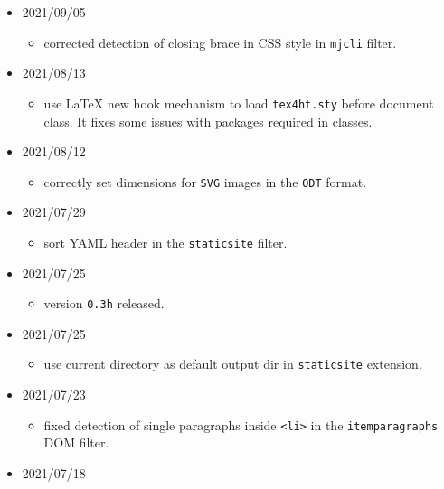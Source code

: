 \begin{itemize}
  \begin{itemize}
  \tightlist
  \item
    corrected SVG dimension setting in the ODT output. Dimensions are
    set also for PNG and JPG pictures.
  \end{itemize}
\item
  2021/09/05

  \begin{itemize}
  \tightlist
  \item
    corrected detection of closing brace in CSS style in \texttt{mjcli}
    filter.
  \end{itemize}
\item
  2021/08/13

  \begin{itemize}
  \tightlist
  \item
    use LaTeX new hook mechanism to load \texttt{tex4ht.sty} before
    document class. It fixes some issues with packages required in
    classes.
  \end{itemize}
\item
  2021/08/12

  \begin{itemize}
  \tightlist
  \item
    correctly set dimensions for \texttt{SVG} images in the \texttt{ODT}
    format.
  \end{itemize}
\item
  2021/07/29

  \begin{itemize}
  \tightlist
  \item
    sort YAML header in the \texttt{staticsite} filter.
  \end{itemize}
\item
  2021/07/25

  \begin{itemize}
  \tightlist
  \item
    version \texttt{0.3h} released.
  \end{itemize}
\item
  2021/07/25

  \begin{itemize}
  \tightlist
  \item
    use current directory as default output dir in \texttt{staticsite}
    extension.
  \end{itemize}
\item
  2021/07/23

  \begin{itemize}
  \tightlist
  \item
    fixed detection of single paragraphs inside
    \texttt{\textless{}li\textgreater{}} in the \texttt{itemparagraphs}
    DOM filter.
  \end{itemize}
\item
  2021/07/18


\end{itemize}
